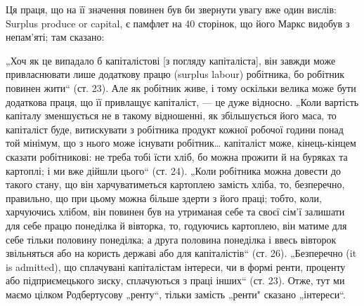 \parcont{}  %
Ця праця, що на її значення повинен був би звернути увагу вже один
вислів: Surplus produce or capital, є памфлет на 40 сторінок, що його
Маркс видобув з непам’яті; там сказано:

„Хоч як це випадало б капіталістові [з погляду капіталіста], він
завжди може привласнювати лише додаткову працю (surplus labour) робітника,
бо робітник повинен жити“ (ст. 23). Але як робітник живе,
і тому оскільки велика може бути додаткова праця, що її привлащує
капіталіст, — це дуже відносно. „Коли вартість капіталу зменшується
не в такому відношенні, як збільшується його маса, то капіталіст буде,
витискувати з робітника продукт кожної робочої години понад той мінімум,
що з нього може існувати робітник\dots{} капіталіст може, кінець-кінцем
сказати робітникові: не треба тобі їсти хліб, бо можна прожити й на
буряках та картоплі; і ми вже дійшли цього“ (ст. 24). „Коли робітника
можна довести до такого стану, що він харчуватиметься картоплею замість
хліба, то, безперечно, правильно, що при цьому можна більше здерти з
його праці; тобто, коли, харчуючись хлібом, він повинен був на утриманая
себе та своєї сім’ї залишати для себе працю понеділка й вівторка,
то, годуючись картоплею, він матиме для себе тільки половину понеділка;
а друга половина понеділка і ввесь вівторок звільняться або на користь
державі або для капіталістів“ (ст. 26). „Безперечно (it is admitted),
що сплачувані капіталістам інтереси, чи в формі ренти, проценту або
підприємецького зиску, сплачуються з праці інших“ (ст. 23). Отже, тут
ми маємо цілком Родбертусову „ренту“, тільки замість „ренти" сказано
„інтереси“.


